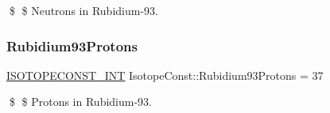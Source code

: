 \$ \$ Neutrons in Rubidium-\/93. \mbox{\label{group___isotope_const-_rubidium-_rb93_ga83ca551de59920e16775540bfcff686e}} 
\subsubsection{\texorpdfstring{Rubidium93\+Protons}{Rubidium93Protons}}
{\footnotesize\ttfamily \mbox{\hyperlink{group___isotope_const-_macros_ga5f18360b3e99483a35c32d789e62621c}{I\+S\+O\+T\+O\+P\+E\+C\+O\+N\+S\+T\+\_\+\+I\+NT}} Isotope\+Const\+::\+Rubidium93\+Protons = 37}

\$ \$ Protons in Rubidium-\/93. 